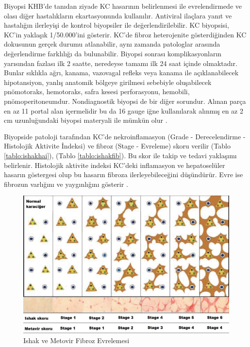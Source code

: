 Biyopsi KHB'de tanıdan ziyade KC hasarının belirlenmesi ile evrelendirmede ve olası diğer hastalıkların ekartasyonunda kullanılır. Antiviral ilaçlara yanıt ve hastalığın ilerleyişi de kontrol biyopsiler ile değerlendirilebilir. KC biyopsisi, KC'in yaklaşık 1/50.000'ini gösterir. KC'de fibroz heterojenite gösterdiğinden KC dokusunun gerçek durumu atlanabilir, aynı zamanda patologlar arasında değerlendirme farklılığı da bulunabilir. Biyopsi sonrası komplikasyonların yarısından fazlası ilk 2 saatte, neredeyse tamamı ilk 24 saat içinde olmaktadır. Bunlar sıklıkla ağrı, kanama, vazovagal refleks veya kanama ile açıklanabilecek hipotansiyon, yanlış anatomik bölgeye girilmesi sebebiyle oluşabilecek pnömotoraks, hemotoraks, safra kesesi perforasyonu, hemobili, pnömoperitoneumdur. Nondiagnostik biyopsi de bir diğer sorundur. Alınan parça en az 11 portal alan içermelidir bu da 16 gauge iğne kullanılarak alınmış en az 2 cm uzunluğundaki biyopsi materyali ile mümkün olur \cite{standish2006appraisal}. 

Biyopside patoloji tarafından KC'de nekroinflamasyon (Grade - Derecelendirme - Histolojik Aktivite İndeksi) ve fibroz (Stage - Evreleme) skoru verilir (Tablo \ref{tablo:ishakhai}), (Tablo \ref{tablo:ishakfib}). Bu skor ile takip ve tedavi yaklaşımı belirlenir. Histolojik aktivite indeksi KC'deki inflamasyon ve hepatoselüler hasarın göstergesi olup bu hasarın fibroza ilerleyebileceğini düşündürür. Evre ise fibrozun varlığını ve yaygınlığını gösterir \cite{guido2011chronic}.  

\bigskip

\begin{figure}[tbph]
\centering
\includegraphics[width=0.9\linewidth]{../Figures/pato}
\caption[Ishak ve Metovir fibroz evrelemesi]{Ishak ve Metovir Fibroz Evrelemesi \cite{guido2011chronic,standish2006appraisal}}
\label{fig:pato}
\end{figure}






